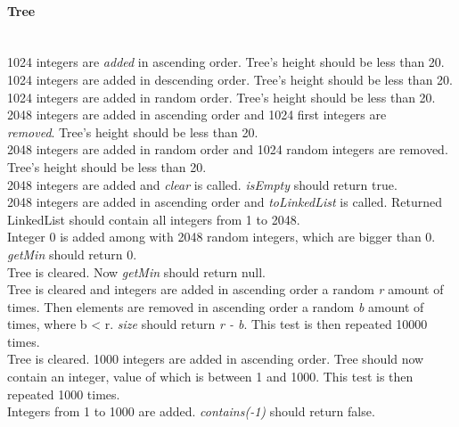 \documentclass[a4paper,12pt]{article}
\begin{document}
\paragraph{\large Tree} \hspace{0pt} \\
1024 integers are \emph{added} in ascending order. Tree's height should be less than 20.\\
1024 integers are added in descending order. Tree's height should be less than 20.\\
1024 integers are added in random order. Tree's height should be less than 20.\\
2048 integers are added in ascending order and 1024 first integers are\\ \emph{removed}. Tree's height should be less than 20.\\
2048 integers are added in random order and 1024 random integers are removed. Tree's height should be less than 20.\\
2048 integers are added and \emph{clear} is called. \emph{isEmpty} should return true.\\
2048 integers are added in ascending order and \emph{toLinkedList} is called. Returned LinkedList should contain all integers from 1 to 2048.\\
Integer 0 is added among with 2048 random integers, which are bigger than 0. \emph{getMin} should return 0.\\
Tree is cleared. Now \emph{getMin} should return null.\\
Tree is cleared and integers are added in ascending order a random \emph{r} amount of times. Then elements are removed in ascending order a random \emph{b} amount of times, where b \textless{ r}. \emph{size} should return \emph{r - b}. This test is then repeated 10000 times.\\
Tree is cleared. 1000 integers are added in ascending order. Tree should now contain an integer, value of which is between 1 and 1000. This test is then repeated 1000 times.\\
Integers from 1 to 1000 are added. \emph{contains(-1)} should return false.
\end{document}
